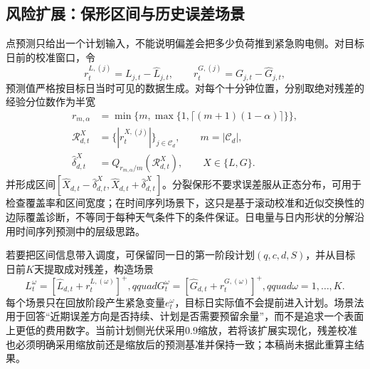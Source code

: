 \documentclass[UTF8,12pt,a4paper]{ctexart}
\begin{document}
\subsection{风险扩展：保形区间与历史误差场景}
点预测只给出一个计划输入，不能说明偏差会把多少负荷推到紧急购电侧。对目标日前的校准窗口，令
\begin{equation}
 r^{L,(j)}_t=L_{j,t}-\widehat L_{j,t},\qquad r^{G,(j)}_t=G_{j,t}-\widehat G_{j,t},
\end{equation}
预测值严格按目标日当时可见的数据生成。对每个十分钟位置，分别取绝对残差的经验分位数作为半宽
\begin{equation}
 \begin{aligned}
 r_{m,\alpha}&=\min\{m,\max\{1,\lceil(m+1)(1-\alpha)\rceil\}\},\\
 \mathcal R^{X}_{d,t}&=\bigl\{|r^{X,(j)}_t|\bigr\}_{j\in\mathcal C_d},\qquad m=|\mathcal C_d|,\\
 \widehat\delta^{X}_{d,t}&=Q_{r_{m,\alpha}/m}\left(\mathcal R^{X}_{d,t}\right),\qquad X\in\{L,G\}.
 \end{aligned}
\end{equation}
并形成区间$[\widehat X_{d,t}-\widehat\delta^X_{d,t},\widehat X_{d,t}+\widehat\delta^X_{d,t}]$。分裂保形不要求误差服从正态分布，可用于检查覆盖率和区间宽度；在时间序列场景下，这只是基于滚动校准和近似交换性的边际覆盖诊断，不等同于每种天气条件下的条件保证\cite{romano}。日电量与日内形状的分解沿用时间序列预测中的层级思路\cite{hyndman}。

若要把区间信息带入调度，可保留同一日的第一阶段计划$(q,c,d,S)$，并从目标日前$K$天提取成对残差，构造场景
\begin{equation}
 L^{\omega}_t=[\widehat L_{d,t}+r^{L,(\omega)}_t]^+,qquad
 G^{\omega}_t=[\widehat G_{d,t}+r^{G,(\omega)}_t]^+,qquad \omega=1,\ldots,K .
\end{equation}
每个场景只在回放阶段产生紧急变量$e_t^\omega$，目标日实际值不会提前进入计划。场景法用于回答“近期误差方向是否持续、计划是否需要预留余量”，而不是追求一个表面上更低的费用数字。当前计划侧光伏采用0.9缩放，若将该扩展实现化，残差校准也必须明确采用缩放前还是缩放后的预测基准并保持一致；本稿尚未据此重算主结果。
\end{document}
